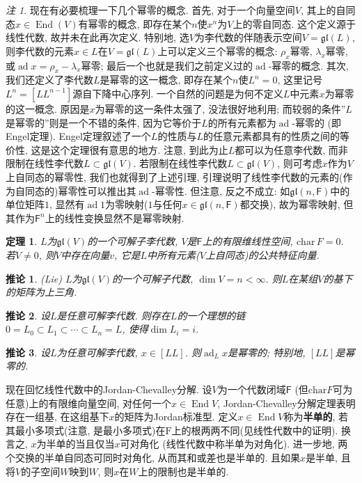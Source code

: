 \documentclass{ctexart}%
\newtheorem{theorem}{定理}
\newtheorem{corollary}{推论}
\theoremstyle{definition}
\theoremstyle{remark}
\newtheorem{remark}{注}
\DeclareMathOperator{\ad}{ad}
\DeclareMathOperator{\End}{End}
\begin{document}
\begin{remark}
现在有必要梳理一下几个幂零的概念. 首先, 对于一个向量空间$V$, 其上的自同态$x\in \End(V)$有幂零的概念, 即存在某个$n$使$x^n$为$V$上的零自同态. 这个定义源于线性代数, 故并未在此再次定义. 特别地, 选$V$为李代数的伴随表示空间$V=\mathfrak{gl}(L)$, 则李代数的元素$x\in L$在$V=\mathfrak{gl}(L)$上可以定义三个幂零的概念: $\rho_x$幂零, $\lambda_x$幂零, 或$\ad x=\rho_x-\lambda_x$幂零; 最后一个也就是我们之前定义过的$\ad$-幂零的概念. 其次, 我们还定义了李代数$L$是幂零的这一概念, 即存在某个$n$使$L^n=0$, 这里记号$L^n=[LL^{n-1}]$源自下降中心序列. 一个自然的问题是为何不定义$L$中元素$x$为幂零的这一概念. 原因是$x$为幂零的这一条件太强了, 没法很好地利用; 而较弱的条件''$L$是幂零的''则是一个不错的条件, 因为它等价于$L$的所有元素都为$\ad$-幂零的 (即Engel定理). Engel定理叙述了一个$L$的性质与$L$的任意元素都具有的性质之间的等价性, 这是这个定理很有意思的地方. 注意, 到此为止$L$都可以为任意李代数, 而非限制在线性李代数$L\subset \mathfrak{gl}(V)$. 若限制在线性李代数$L\subset \mathfrak{gl}(V)$, 则可考虑$x$作为$V$上自同态的幂零性, 我们也就得到了上述引理, 引理说明了线性李代数的元素的(作为自同态的)幂零性可以推出其$\ad$-幂零性. 但注意, 反之不成立: 如$\mathfrak{gl}(n,\mathsf{F})$中的单位矩阵$1$, 显然有$\ad 1$为零映射($1$与任何$x\in \mathfrak{gl}(n,\mathsf{F})$都交换), 故为幂零映射, 但其作为$\mathsf{F}^n$上的线性变换显然不是幂零映射.
\end{remark}

\begin{theorem}$L$为$\mathfrak{gl}(V)$的一个可解子李代数, $V$是$\mathsf{F}$上的有限维线性空间, $\mathrm{char}\,F =0$. 若$V\neq 0$, 则$V$中存在向量$v$, 它是$L$中所有元素($V$上自同态)的公共特征向量.
\end{theorem}

\begin{corollary}(Lie) $L$为$\mathfrak{gl}(V)$的一个可解子代数, $\dim V=n<\infty$. 则$L$在某组$V$的基下的矩阵为上三角.
\end{corollary}

\begin{corollary}设$L$是任意可解李代数. 则存在$L$的一个理想的链$0=L_0\subset L_1\subset \cdots \subset L_n=L$, 使得$\dim L_i = i$.
\end{corollary}

\begin{corollary}\label{4.1C}
设$L$为任意可解李代数, $x\in [LL]$. 则$\ad_L x$是幂零的; 特别地, $[LL]$是幂零的.
\end{corollary}

现在回忆线性代数中的Jordan-Chevalley分解. 设$V$为一个代数闭域$\mathsf{F}$ (但$\mathrm{char}F$可为任意)上的有限维向量空间, 对任何一个$x\in \End V$, Jordan-Chevalley分解定理表明存在一组基, 在这组基下$x$的矩阵为Jordan标准型. 定义$x\in \End  V$称为\textbf{半单的}, 若其最小多项式(注意, 是最小多项式)在$\mathrm{F}$上的根两两不同(见线性代数中的证明). 换言之, $x$为半单的当且仅当$x$可对角化 (线性代数中称半单为对角化). 进一步地, 两个交换的半单自同态可同时对角化, 从而其和或差也是半单的. 且如果$x$是半单, 且将$V$的子空间$W$映到$W$, 则$x$在$W$上的限制也是半单的. 
\end{document}
